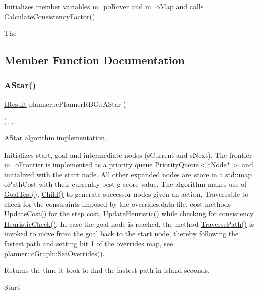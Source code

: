Initializes member variables m\+\_\+po\+Rover and m\+\_\+o\+Map and calls \mbox{\hyperlink{classplanner_1_1c_planner_a2e5a745f83f903662eff914d8beddb5e}{Calculate\+Consistency\+Factor()}}. 

The 

\subsection{Member Function Documentation}
\mbox{\label{classplanner_1_1c_planner_r_b_g_affd7011ef4df878a8e95ecf7f42c8e6f}} 
\subsubsection{\texorpdfstring{A\+Star()}{AStar()}}
{\footnotesize\ttfamily \mbox{\hyperlink{structt_result}{t\+Result}} planner\+::c\+Planner\+R\+B\+G\+::\+A\+Star (\begin{DoxyParamCaption}{ }\end{DoxyParamCaption})\hspace{0.3cm}{\ttfamily [override]}, {\ttfamily [protected]}, {\ttfamily [virtual]}}



A\+Star algorithm implementation. 

Initializes start, goal and intermediate nodes (s\+Current and s\+Next). The frontier m\+\_\+o\+Frontier is implemented as a priority queue Priority\+Queue$<$t\+Node$\ast$$>$ and initialized with the start node. All other expanded nodes are store in a std\+::map o\+Path\+Cost with their currently best g score value. The algorithm makes use of \mbox{\hyperlink{classplanner_1_1c_planner_a6b7554394efd7ad10d76a49b370aa62f}{Goal\+Test()}}, \mbox{\hyperlink{classplanner_1_1c_planner_adbffc6ce05119c940a09369d7e61554e}{Child()}} to generate successor nodes given an action, Traversable to check for the constraints imposed by the overrides.\+data file, cost methods \mbox{\hyperlink{classplanner_1_1c_planner_a16e8c156297fff49a6ba9b97073baffb}{Update\+Cost()}} for the step cost, \mbox{\hyperlink{classplanner_1_1c_planner_ab7cc7c2666de2e49f745901080aac147}{Update\+Heuristic()}} while checking for consistency \mbox{\hyperlink{classplanner_1_1c_planner_a1234d075676fcaa2c17b859d11b4638c}{Heuristic\+Check()}}. In case the goal node is reached, the method \mbox{\hyperlink{classplanner_1_1c_planner_a8624cb2afb8f2fd216c38b4424013178}{Traverse\+Path()}} is invoked to move from the goal back to the start node, thereby following the fastest path and setting bit 1 of the overrides map, see \mbox{\hyperlink{classplanner_1_1c_graph_a6da6e6e269013628aef48245a7787cb9}{planner\+::c\+Graph\+::\+Set\+Overrides()}}. \begin{DoxyReturn}{Returns}
the time it took to find the fastest path in island seconds. 
\end{DoxyReturn}
Start

